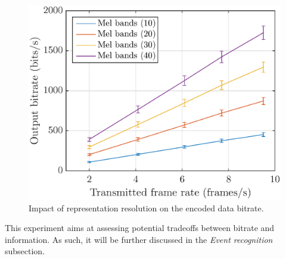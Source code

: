 \documentclass[final,3p,times,twocolumn]{elsarticle}
\begin{document}
\begin{figure}[htbp]
	\centering
		\includegraphics[width=\columnwidth]{figures/bitrate_mel_avg.eps}
	\caption{Impact of representation resolution on the encoded data bitrate.}
	\label{fig:bitrate_mel_avg}
\end{figure}

This experiment aims at assessing potential tradeoffs between bitrate and information. As such, it will be further discussed in the \textit{Event recognition} subsection.\\
\end{document}
